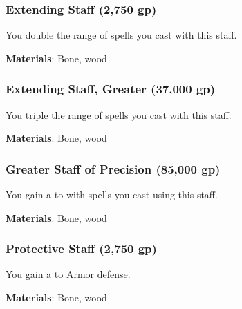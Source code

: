 
\lowercase{\hypertarget{item:Extending Staff}{}}\label{item:Extending Staff}
\hypertarget{item:Extending Staff}{\subsubsection{Extending Staff\hfill{} (2,750 gp)}}

You double the range of spells you cast with this staff.



\textbf{Materials}: Bone, wood


\lowercase{\hypertarget{item:Extending Staff, Greater}{}}\label{item:Extending Staff, Greater}
\hypertarget{item:Extending Staff, Greater}{\subsubsection{Extending Staff, Greater\hfill{} (37,000 gp)}}

You triple the range of spells you cast with this staff.



\textbf{Materials}: Bone, wood


\lowercase{\hypertarget{item:Greater Staff of Precision}{}}\label{item:Greater Staff of Precision}
\hypertarget{item:Greater Staff of Precision}{\subsubsection{Greater Staff of Precision\hfill{} (85,000 gp)}}

You gain a   to  with spells you cast using this staff.



\textbf{Materials}: Bone, wood


\lowercase{\hypertarget{item:Protective Staff}{}}\label{item:Protective Staff}
\hypertarget{item:Protective Staff}{\subsubsection{Protective Staff\hfill{} (2,750 gp)}}

You gain a   to Armor defense.



\textbf{Materials}: Bone, wood


